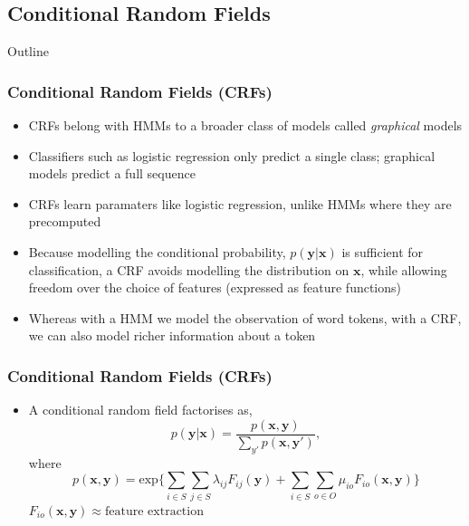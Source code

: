 \documentclass{beamer}
\begin{document}

\subsection{Conditional Random Fields}


\begin{frame}[noframenumbering]{Outline}
\tableofcontents[currentsubsection]
\end{frame}


\begin{frame}
\frametitle{Conditional Random Fields (CRFs)}
\begin{itemize}
\item CRFs belong with HMMs to a broader class of models called \emph{graphical} models
\item Classifiers such as logistic regression only predict a single class; graphical models predict a full sequence
\item CRFs learn paramaters like logistic regression, unlike HMMs where they are precomputed
\item Because modelling the conditional probability, $p(\textbf{y} | \textbf{x})$ is sufficient for classification, a CRF avoids modelling the distribution on $\textbf{x}$, while allowing freedom over the choice of features (expressed as feature functions)
\item Whereas with a HMM we model the observation of word tokens, with a CRF, we can also model richer information about a token
\end{itemize}
\end{frame}


\begin{frame}

\frametitle{Conditional Random Fields (CRFs)}
\begin{itemize}
\item A conditional random field factorises as,
$$p(\textbf{y}|\textbf{x}) = \frac{p(\textbf{x}, \textbf{y})}{\sum_{y'}{p(\textbf{x}, \textbf{y}')}},$$ where
$$
p(\textbf{x}, \textbf{y}) = \text{exp} \Bigg\{
\sum_{i \in S}
\sum_{j \in S}
\lambda_{ij}
F_{ij}(\textbf{y})
+ 
\sum_{i \in S}
\sum_{o \in O}
\mu_{io}
F_{io}(\textbf{x}, \textbf{y})
\Bigg\}
$$
$F_{io}(\textbf{x}, \textbf{y}) \approx \text{feature extraction}$
\end{itemize}

\end{frame}
\end{document}
